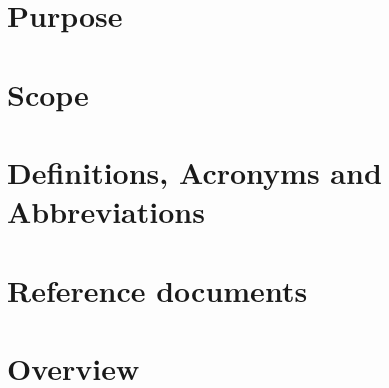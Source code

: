 \section{Purpose}

\section{Scope}

\section{Definitions, Acronyms and Abbreviations}

\section{Reference documents}

\section{Overview}

